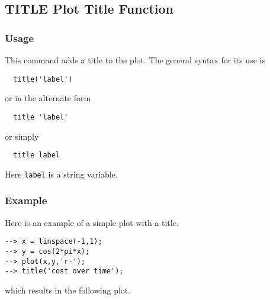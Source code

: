 %
%
%
\subsection{TITLE Plot Title Function}
\subsubsection{Usage}
This command adds a title to the plot.  The general syntax
for its use is
\begin{verbatim}
  title('label')
\end{verbatim}
or in the alternate form
\begin{verbatim}
  title 'label'
\end{verbatim}
or simply
\begin{verbatim}
  title label
\end{verbatim}
Here \verb|label| is a string variable.
\subsubsection{Example}
Here is an example of a simple plot with a title.
\begin{verbatim}
--> x = linspace(-1,1);
--> y = cos(2*pi*x);
--> plot(x,y,'r-');
--> title('cost over time');
\end{verbatim}
which results in the following plot.

